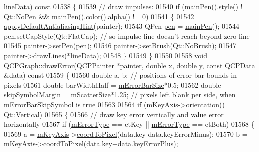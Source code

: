 \begin{DoxyCode}
      lineData)\textcolor{keyword}{ const}
01538 \textcolor{keyword}{}\{
01539   \textcolor{comment}{// draw impulses:}
01540   \textcolor{keywordflow}{if} (\hyperlink{a00024_a19276ed2382a3a06464417b8788b1451}{mainPen}().style() != Qt::NoPen && \hyperlink{a00024_a19276ed2382a3a06464417b8788b1451}{mainPen}().\hyperlink{a00116_ae35093fbf4f645dcefd930ca8c68b622}{color}().alpha() != 0)
01541   \{
01542     \hyperlink{a00024_a76e9d6cc7972dc1528f526d163766aca}{applyDefaultAntialiasingHint}(painter);
01543     QPen \hyperlink{a00024_a41d060007cc6b3037c9c04d22d0c0398}{pen} = \hyperlink{a00024_a19276ed2382a3a06464417b8788b1451}{mainPen}();
01544     pen.setCapStyle(Qt::FlatCap); \textcolor{comment}{// so impulse line doesn't reach beyond zero-line}
01545     painter->\hyperlink{a00047_af9c7a4cd1791403901f8c5b82a150195}{setPen}(pen);
01546     painter->setBrush(Qt::NoBrush);
01547     painter->drawLines(*lineData);
01548   \}
01549 \}
01550 
\hypertarget{a00115_source_l01558}{}\hyperlink{a00031_a4df6807066ce877705e999773e7ffbc4}{01558} \textcolor{keywordtype}{void} \hyperlink{a00031_a4df6807066ce877705e999773e7ffbc4}{QCPGraph::drawError}(\hyperlink{a00047}{QCPPainter} *painter, \textcolor{keywordtype}{double} x, \textcolor{keywordtype}{double} y, \textcolor{keyword}{const} 
      \hyperlink{a00030_d2/d94/a00184}{QCPData} &data)\textcolor{keyword}{ const}
01559 \textcolor{keyword}{}\{
01560   \textcolor{keywordtype}{double} a, b; \textcolor{comment}{// positions of error bar bounds in pixels}
01561   \textcolor{keywordtype}{double} barWidthHalf = \hyperlink{a00031_a7b51c8d09510f9d195b5e765ccbcf05b}{mErrorBarSize}*0.5;
01562   \textcolor{keywordtype}{double} skipSymbolMargin = \hyperlink{a00031_a0a1d01359f53211427fb4d71a71dbbec}{mScatterSize}*1.25; \textcolor{comment}{// pixels left blank per side, when
       mErrorBarSkipSymbol is true}
01563 
01564   \textcolor{keywordflow}{if} (\hyperlink{a00024_a692421b963472fa6e16156a74ba96832}{mKeyAxis}->\hyperlink{a00025_a57483f2f60145ddc9e63f3af53959265}{orientation}() == Qt::Vertical)
01565   \{
01566     \textcolor{comment}{// draw key error vertically and value error horizontally}
01567     \textcolor{keywordflow}{if} (\hyperlink{a00031_a29e64273db201aeadebc61c870720a36}{mErrorType} == etKey || \hyperlink{a00031_a29e64273db201aeadebc61c870720a36}{mErrorType} == etBoth)
01568     \{
01569       a = \hyperlink{a00024_a692421b963472fa6e16156a74ba96832}{mKeyAxis}->\hyperlink{a00025_a985ae693b842fb0422b4390fe36d299a}{coordToPixel}(data.key-data.keyErrorMinus);
01570       b = \hyperlink{a00024_a692421b963472fa6e16156a74ba96832}{mKeyAxis}->\hyperlink{a00025_a985ae693b842fb0422b4390fe36d299a}{coordToPixel}(data.key+data.keyErrorPlus);

\end{DoxyCode}
